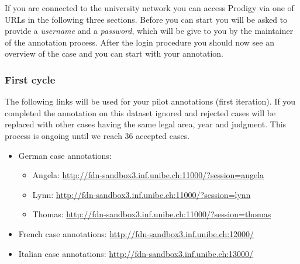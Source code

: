\documentclass{article}
\begin{document}
If you are connected to the university network you can access Prodigy via one of URLs in the following three sections. Before you can start you will be asked to provide a \emph{username} and a \emph{password}, which will be give to you by the maintainer of the annotation process. After the login procedure you should now see an overview of the case and you can start with your annotation.

\subsubsection{First cycle}\label{1_cycle}
The following links will be used for your pilot annotations (first iteration). If you completed the annotation on this dataset ignored and rejected cases will be replaced with other cases having the same legal area, year and judgment. This process is ongoing until we reach 36 accepted cases.
\begin{itemize}
\item German case annotations:
\begin{itemize}
\item Angela: \href{http://fdn-sandbox3.inf.unibe.ch:11000/?session=angela}{http://fdn-sandbox3.inf.unibe.ch:11000/?session=angela}
    \item Lynn: \href{http://fdn-sandbox3.inf.unibe.ch:11000/?session=lynn}{http://fdn-sandbox3.inf.unibe.ch:11000/?session=lynn}
    \item Thomas: \href{http://fdn-sandbox3.inf.unibe.ch:11000/?session=thomas}{http://fdn-sandbox3.inf.unibe.ch:11000/?session=thomas}
\end{itemize}
    \item French case annotations: \href{http://fdn-sandbox3.inf.unibe.ch:12000/}{http://fdn-sandbox3.inf.unibe.ch:12000/}
    \item Italian case annotations: \href{http://fdn-sandbox3.inf.unibe.ch:13000/}{http://fdn-sandbox3.inf.unibe.ch:13000/}
\end{itemize}
\end{document}
